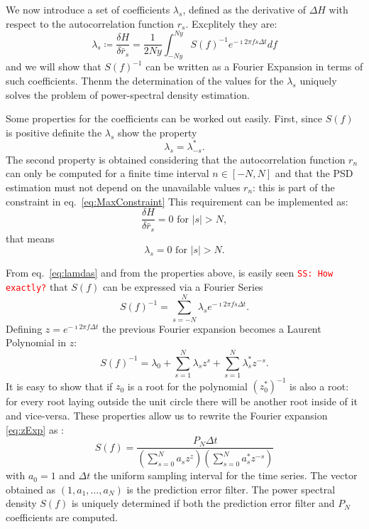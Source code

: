 \documentclass[twocolumn,showpacs,preprintnumbers,nofootinbib,prd,
superscriptaddress,10pt]{revtex4-1}
\newcommand{\sschmidt}[1]{{\textcolor{red}{\texttt{SS: #1}} }}
\begin{document}
We now introduce a set of coefficients $\lambda_s$, defined as the derivative of $\Delta H$ with respect to the autocorrelation function $r_s$.
Excplitely they are:
\begin{equation} \label{eq:lamdas}
      \lambda_s \coloneqq \frac{\delta H}{\delta \bar r_s} = \frac{1}{2Ny}\int_{-Ny}^{Ny} S(f)^{-1}e^{-\imath 2 \pi f s \Delta t } df
\end{equation} 
and we will show that $S(f)^{-1}$ can be written as a Fourier Expansion in terms of such coefficients. Thenm the determination of the values for the $\lambda_s$ uniquely solves the problem of power-spectral density estimation.

Some properties for the coefficients can be worked out easily. First, since $S(f)$ is positive definite the $\lambda_s$ show the property 
\begin{equation}
	\nonumber 
	\lambda_s = \lambda_{-s}^*. 
\end{equation}
The second property is obtained considering that the autocorrelation function $r_n$ can only be computed for a finite time interval $n \in [-N, N]$ and that the PSD estimation must not depend on the unavailable values $r_n$: this is part of the constraint in eq.~\eqref{eq:MaxConstraint}
This requirement can be implemented as:  
\begin{equation}\nonumber 
    \frac{\delta H}{\delta \bar r_s} = 0 \text{ for } \vert s \vert > N,
\end{equation}
that means 
\begin{equation}
\nonumber 
\lambda_s = 0 \text{ for } \vert s \vert > N. 
\end{equation}

From eq.~\eqref{eq:lamdas} and from the properties above, is easily seen \sschmidt{How exactly?} that $S(f)$ can be expressed via a Fourier Series 
\begin{equation}\label{eq:PSDconstraint}
    S(f)^{-1} = \sum_{s = -N}^N \lambda_s e^{-\imath 2 \pi f s \Delta t}.
\end{equation}
Defining $z = e^{-\imath 2 \pi f \Delta t}$ the previous Fourier expansion becomes a Laurent Polynomial in $z$: 
\begin{equation}
    \label{eq:zExp}
    S(f)^{-1} = \lambda_0 + \sum_{s = 1}^N \lambda_s z^s + \sum_{s = 1}^N \lambda^*_s z^{-s}.
\end{equation}
It is easy to show that if $z_0$ is a root for the polynomial $(z_0^*)^{-1}$ is also a root: for every root laying outside the unit circle there will be another root inside of it and vice-versa. These properties allow us to rewrite the Fourier expansion \eqref{eq:zExp} as \cite{1975STIN...7714318B}:
\begin{equation}\label{eq:MESApsd_appendix}
    S(f) = \frac{P_N \Delta t}{\left(\sum_{s=0}^N a_s z^z\right)\left(\sum_{s = 0}^N a^*_s z^{-s}\right)}
\end{equation}
with $a_0 = 1$ and $\Delta t$ the uniform sampling interval for the time series. The vector obtained as $(1, a_1, \dots, a_N)$ is the prediction error filter. The power spectral density $S(f)$ is uniquely determined if both the prediction error filter and $P_N$ coefficients are computed.
\end{document}
